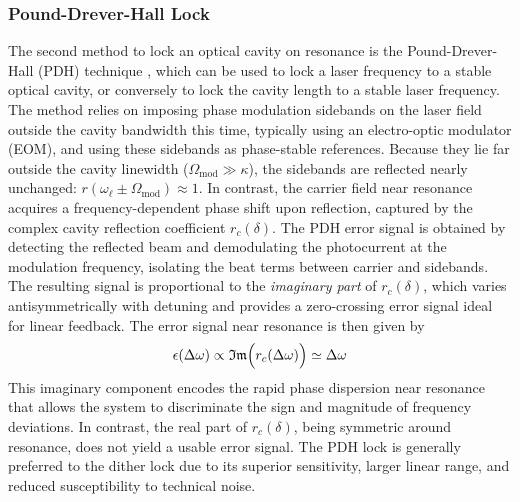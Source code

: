 \subsubsection{Pound-Drever-Hall Lock}
The second method to lock an optical cavity on resonance is the Pound-Drever-Hall (PDH) technique \cite{drever83}, which can be used to lock a laser frequency to a stable optical cavity, or conversely to lock the cavity length to a stable laser frequency. 
The method relies on imposing phase modulation sidebands on the laser field outside the cavity bandwidth this time, typically using an electro-optic modulator (EOM), and using these sidebands as phase-stable references. Because they lie far outside the cavity linewidth (\( \Omega_{\text{mod}} \gg \kappa \)), the sidebands are reflected nearly unchanged: \( r(\omega_\ell \pm \Omega_{\text{mod}}) \approx 1 \). In contrast, the carrier field near resonance acquires a frequency-dependent phase shift upon reflection, captured by the complex cavity reflection coefficient \( r_c(\delta) \). The PDH error signal is obtained by detecting the reflected beam and demodulating the photocurrent at the modulation frequency, isolating the beat terms between carrier and sidebands. The resulting signal is proportional to the \textit{imaginary part} of \( r_c(\delta) \), which varies antisymmetrically with detuning and provides a zero-crossing error signal ideal for linear feedback. The error signal near resonance is then given by 
\begin{equation}
\epsilon(\Delta \omega) \propto \mathfrak{Im} \Bigl(r_c(\Delta \omega)\Bigr)\simeq \Delta \omega
\end{equation}
This imaginary component encodes the rapid phase dispersion near resonance that allows the system to discriminate the sign and magnitude of frequency deviations. In contrast, the real part of \( r_c(\delta) \), being symmetric around resonance, does not yield a usable error signal. The PDH lock is generally preferred to the dither lock due to its superior sensitivity, larger linear range, and reduced susceptibility to technical noise. \\

